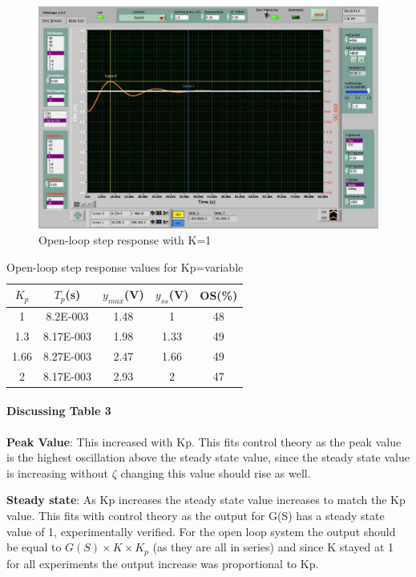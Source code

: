 \documentclass{article}
\begin{document}
\begin{figure}[ht]
\centering
\includegraphics[width=7in]{4_2.jpg}
\caption{Open-loop step response with K=1}
\end{figure}

\begin{table}[ht]
\centering
    \begin{tabular}{|c|c|c|c|c|}
        \hline
        $K_p$ & $T_p$(s) & $y_{max}$(V) & $y_{ss}$(V) & OS(\%)\\
        \hline
        1 &8.2E-003 & 1.48 & 1 & 48\\
        \hline
        1.3 & 8.17E-003 & 1.98 & 1.33 & 49\\
        \hline
        1.66 & 8.27E-003 & 2.47 & 1.66 & 49\\
        \hline
        2 &8.17E-003 & 2.93 & 2 & 47\\
        \hline
    \end{tabular}
    \caption{Open-loop step response values for Kp=variable}
\end{table}

\paragraph{Discussing Table 3}

\textbf{Peak Value}: This increased with Kp. This fits control theory as the peak value is the highest oscillation above the steady state value, since the steady state value is increasing without $\zeta$ changing this value should rise as well.

\textbf{Steady state}: As Kp increases the steady state value increases to match the Kp value. This fits with control theory as the output for G(S) has a steady state value of 1, experimentally verified. For the open loop system the output should be equal to $G(S)\times K\times K_p$ (as they are all in series) and since K stayed at 1 for all experiments the output increase was proportional to Kp.
\end{document}

